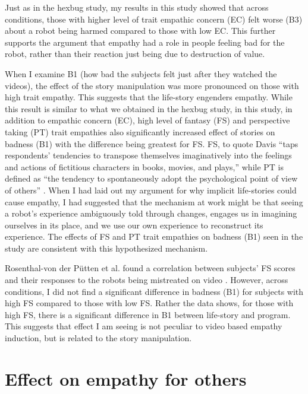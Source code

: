 Just as in the hexbug study, my results in this study showed that across conditions, those with higher level of trait empathic concern (EC) felt worse (B3) about a robot being harmed compared to those with low EC. This further supports the argument that empathy had a role in people feeling bad for the robot, rather than their reaction just being due to destruction of value. 


When I examine B1 (how bad the subjects felt just after they watched the videos), the effect of the story manipulation was more pronounced on those with high trait empathy. This suggests that the life-story engenders empathy. While this result is similar to what we obtained in the hexbug study, in this study, in addition to empathic concern (EC), high level of fantasy (FS) and perspective taking (PT) trait empathies also significantly increased effect of stories on badness (B1) with the difference being greatest for FS. FS, to quote Davis ``taps respondents' tendencies to transpose themselves imaginatively into the feelings and actions of fictitious characters in books, movies, and plays,'' while PT is defined as ``the tendency to spontaneously adopt the psychological point of view of others'' \cite{davis_multidimensional_empathy}. When I had laid out my argument for why implicit life-stories could cause empathy, I had suggested that the mechanism at work might be that seeing a robot's experience ambiguously told through changes, engages us in imagining ourselves in its place, and we use our own experience to reconstruct its experience. The effects of FS and PT trait empathies on badness (B1) seen in the study are consistent with this hypothesized mechanism. 

Rosenthal-von der P{\"u}tten et al. found a correlation between subjects' FS scores and their responses to the robots being mistreated on video \cite{rosenthal_emotional_reaction}. However, across conditions, I did not find a significant difference in badness (B1) for subjects with high FS compared to those with low FS. Rather the data shows, for those with high FS, there is a significant difference in B1 between life-story and program. This suggests that effect I am seeing is not peculiar to video based empathy induction, but is related to the story manipulation. 


\section{Effect on empathy for others}

